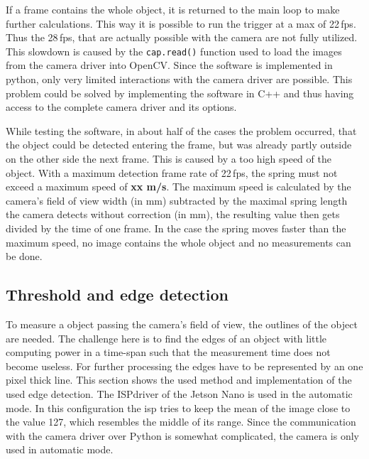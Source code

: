 If a frame contains the whole object, it is returned to the main loop to make further calculations.
This way it is possible to run the trigger at a max of 22\,fps. 
Thus the 28\,fps, that are actually possible with the camera are not fully utilized. 
This slowdown is caused by the \texttt{cap.read()} function used to load the images from the camera driver into OpenCV. 
Since the software is implemented in python, only very limited interactions with the camera driver are possible. 
This problem could be solved by implementing the software in C++ and thus having access to the complete camera driver and its options.

While testing the software, in about half of the cases the problem occurred, that the object could be detected entering the frame, but was already partly outside on the other side the next frame. 
This is caused by a too high speed of the object. 
With a maximum detection frame rate of 22\,fps, the spring must not exceed a maximum speed of \textbf{xx m/s}.
The maximum speed is calculated by the camera's field of view width (in mm) subtracted by the maximal spring length the camera detects without correction (in mm), the resulting value then gets divided by the time of one frame. 
In the case the spring moves faster than the maximum speed, no image contains the whole object and no measurements can be done.

\subsection{Threshold and edge detection}
To measure a object passing the camera's field of view, the outlines of the object are needed.
The challenge here is to find the edges of an object with little computing power in a time-span such that the measurement time does not become useless.
For further processing the edges have to be represented by an one pixel thick line.
This section shows the used method and implementation of the used edge detection.
The \acs{ISP}driver of the Jetson Nano is used in the automatic mode.
In this configuration the \acs{isp} tries to keep the mean of the image close to the value 127, which resembles the middle of its range. Since the communication with the camera driver over Python is somewhat complicated, the camera is only used in automatic mode.

